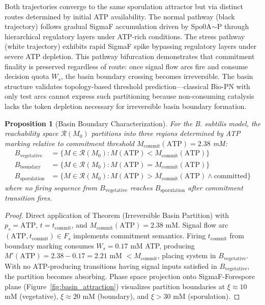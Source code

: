 \documentclass[10pt,letterpaper]{article}
\newtheorem{proposition}{Proposition}
\begin{document}
\vspace{3pt}
\noindent Both trajectories converge to the same sporulation attractor but via distinct routes determined by initial ATP availability. The normal pathway (black trajectory) follows gradual SigmaF accumulation driven by Spo0A$\sim$P through hierarchical regulatory layers under ATP-rich conditions. The stress pathway (white trajectory) exhibits rapid SigmaF spike bypassing regulatory layers under severe ATP depletion. This pathway bifurcation demonstrates that commitment finality is preserved regardless of route: once signal flow arcs fire and consume decision quota $W_s$, the basin boundary crossing becomes irreversible. The basin structure validates topology-based threshold prediction---classical Bio-PN with only test arcs cannot express such partitioning because non-consuming catalysis lacks the token depletion necessary for irreversible basin boundary formation.

\begin{proposition}[Basin Boundary Characterization]
For the B. subtilis model, the reachability space $\mathcal{R}(M_0)$ partitions into three regions determined by ATP marking relative to commitment threshold
$M_{\text{commit}}(\text{ATP}) = 2.38$ mM:
\begin{align*}
B_{\text{vegetative}} &= \{M \in \mathcal{R}(M_0) : M(\text{ATP}) < M_{\text{commit}}(\text{ATP})\} \\
B_{\text{boundary}} &= \{M \in \mathcal{R}(M_0) : M(\text{ATP}) = M_{\text{commit}}(\text{ATP})\} \\
B_{\text{sporulation}} &= \{M \in \mathcal{R}(M_0) : M(\text{ATP}) > M_{\text{commit}}(\text{ATP}) \wedge \text{committed}\}
\end{align*}
where no firing sequence from $B_{\text{vegetative}}$ reaches $B_{\text{sporulation}}$ after commitment transition fires.
\end{proposition}

\begin{proof}
Direct application of Theorem (Irreversible Basin Partition) with $p_s = \text{ATP}$, $t = t_{\text{commit}}$, and
$M_{\text{commit}}(\text{ATP}) = 2.38$ mM.
Signal flow arc $(\text{ATP}, t_{\text{commit}}) \in F_s$ implements commitment semantics. Firing $t_{\text{commit}}$ from boundary marking consumes $W_s = 0.17$ mM ATP, producing
$M'(\text{ATP}) = 2.38 - 0.17 = 2.21$ mM $< M_{\text{commit}}$,
placing system in $B_{\text{vegetative}}$. With no ATP-producing transitions having signal inputs satisfied in $B_{\text{vegetative}}$, the partition becomes absorbing. Phase space projection onto SigmaF-Forespore plane (Figure~\ref{fig:basin_attraction}) visualizes partition boundaries at $\xi \approx 10$ mM (vegetative), $\xi \approx 20$ mM (boundary), and $\xi > 30$ mM (sporulation).
\end{proof}
\end{document}
